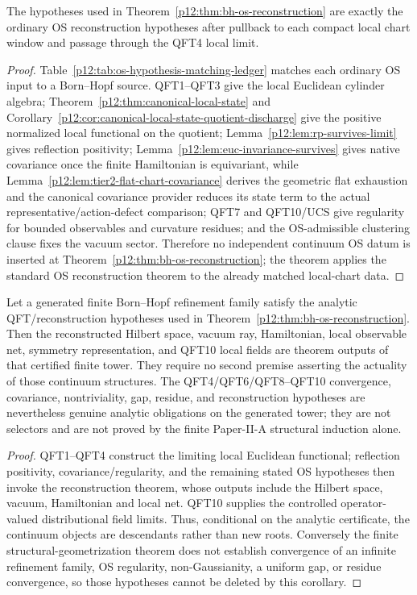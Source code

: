 \documentclass[12pt,a4paper]{article}
\begin{document}
\begin{corollary}
\label{p12:cor:os-hypothesis-ledger-discharge}
The hypotheses used in Theorem~\ref{p12:thm:bh-os-reconstruction} are exactly the ordinary OS reconstruction hypotheses after pullback to each compact local chart window and passage through the QFT4 local limit.
\end{corollary}
\begin{proof}
Table~\ref{p12:tab:os-hypothesis-matching-ledger} matches each ordinary OS input to a Born--Hopf source.  QFT1--QFT3 give the local Euclidean cylinder algebra; Theorem~\ref{p12:thm:canonical-local-state} and Corollary~\ref{p12:cor:canonical-local-state-quotient-discharge} give the positive normalized local functional on the quotient; Lemma~\ref{p12:lem:rp-survives-limit} gives reflection positivity; Lemma~\ref{p12:lem:euc-invariance-survives} gives native covariance once the finite Hamiltonian is equivariant, while Lemma~\ref{p12:lem:tier2-flat-chart-covariance} derives the geometric flat exhaustion and the canonical covariance provider reduces its state term to the actual representative/action-defect comparison; QFT7 and QFT10/UCS give regularity for bounded observables and curvature residues; and the OS-admissible clustering clause fixes the vacuum sector.  Therefore no independent continuum OS datum is inserted at Theorem~\ref{p12:thm:bh-os-reconstruction}; the theorem applies the standard OS reconstruction theorem to the already matched local-chart data.
\end{proof}

\begin{corollary}
\label{p12:cor:fields-are-outputs}
Let a generated finite Born--Hopf refinement family satisfy the analytic
QFT/reconstruction hypotheses used in
Theorem~\ref{p12:thm:bh-os-reconstruction}.  Then the reconstructed Hilbert
space, vacuum ray, Hamiltonian, local observable net, symmetry
representation, and QFT10 local fields are theorem outputs of that certified
finite tower.  They require no second premise asserting the actuality of
those continuum structures.  The QFT4/QFT6/QFT8--QFT10 convergence,
covariance, nontriviality, gap, residue, and reconstruction hypotheses are
nevertheless genuine analytic obligations on the generated tower; they are
not selectors and are not proved by the finite Paper-II-A structural
induction alone.
\end{corollary}
\begin{proof}
QFT1--QFT4 construct the limiting local Euclidean functional; reflection
positivity, covariance/regularity, and the remaining stated OS hypotheses
then invoke the reconstruction theorem, whose outputs include the Hilbert
space, vacuum, Hamiltonian and local net.  QFT10 supplies the controlled
operator-valued distributional field limits.  Thus, conditional on the
analytic certificate, the continuum objects are descendants rather than new
roots.  Conversely the finite structural-geometrization theorem does not
establish convergence of an infinite refinement family, OS regularity,
non-Gaussianity, a uniform gap, or residue convergence, so those hypotheses
cannot be deleted by this corollary.
\end{proof}
\end{document}
